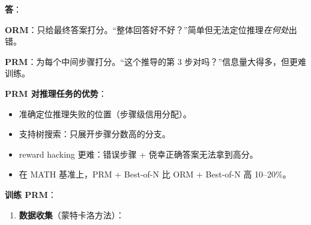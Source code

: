 \begin{questionbox}
\textbf{答}：

\textbf{ORM}：只给最终答案打分。“整体回答好不好？”简单但无法定位推理\emph{在何处}出错。

\textbf{PRM}：为每个中间步骤打分。“这个推导的第 3 步对吗？”信息量大得多，但更难训练。

\textbf{PRM 对推理任务的优势}：

\begin{itemize}
  \item 准确定位推理失败的位置（步骤级信用分配）。
  \item 支持树搜索：只展开步骤分数高的分支。
  \item reward hacking 更难：错误步骤 + 侥幸正确答案无法拿到高分。
  \item 在 MATH 基准上，PRM + Best-of-N 比 ORM + Best-of-N 高 10--20\%。
\end{itemize}

\textbf{训练 PRM}：

\begin{enumerate}
  \item \textbf{数据收集}（蒙特卡洛方法）：


\end{enumerate}
\end{questionbox}
